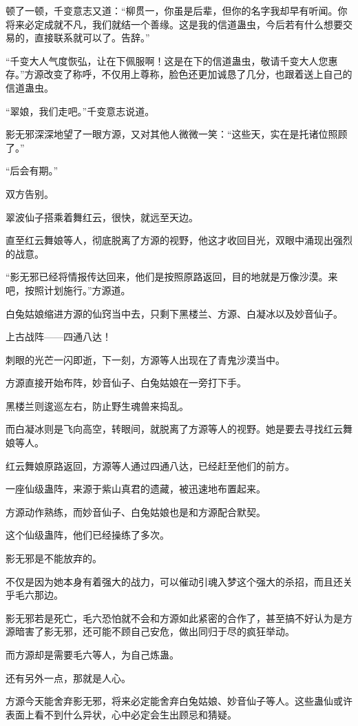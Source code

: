 \begin{this_body}
顿了一顿，千变意志又道：“柳贯一，你虽是后辈，但你的名字我却早有听闻。你将来必定成就不凡，我们就结一个善缘。这是我的信道蛊虫，今后若有什么想要交易的，直接联系就可以了。告辞。”

“千变大人气度恢弘，让在下佩服啊！这是在下的信道蛊虫，敬请千变大人您惠存。”方源改变了称呼，不仅用上尊称，脸色还更加诚恳了几分，也跟着送上自己的信道蛊虫。

“翠娘，我们走吧。”千变意志说道。

影无邪深深地望了一眼方源，又对其他人微微一笑：“这些天，实在是托诸位照顾了。”

“后会有期。”

双方告别。

翠波仙子搭乘着舞红云，很快，就远至天边。

直至红云舞娘等人，彻底脱离了方源的视野，他这才收回目光，双眼中涌现出强烈的战意。

“影无邪已经将情报传达回来，他们是按照原路返回，目的地就是万像沙漠。来吧，按照计划施行。”方源道。

白兔姑娘缩进方源的仙窍当中去，只剩下黑楼兰、方源、白凝冰以及妙音仙子。

上古战阵——四通八达！

刺眼的光芒一闪即逝，下一刻，方源等人出现在了青鬼沙漠当中。

方源直接开始布阵，妙音仙子、白兔姑娘在一旁打下手。

黑楼兰则逡巡左右，防止野生魂兽来捣乱。

而白凝冰则是飞向高空，转眼间，就脱离了方源等人的视野。她是要去寻找红云舞娘等人。

红云舞娘原路返回，方源等人通过四通八达，已经赶至他们的前方。

一座仙级蛊阵，来源于紫山真君的遗藏，被迅速地布置起来。

方源动作熟练，而妙音仙子、白兔姑娘也是和方源配合默契。

这个仙级蛊阵，他们已经操练了多次。

影无邪是不能放弃的。

不仅是因为她本身有着强大的战力，可以催动引魂入梦这个强大的杀招，而且还关乎毛六那边。

影无邪若是死亡，毛六恐怕就不会和方源如此紧密的合作了，甚至搞不好认为是方源暗害了影无邪，还可能不顾自己安危，做出同归于尽的疯狂举动。

而方源却是需要毛六等人，为自己炼蛊。

还有另外一点，那就是人心。

方源今天能舍弃影无邪，将来必定能舍弃白兔姑娘、妙音仙子等人。这些蛊仙或许表面上看不到什么异状，心中必定会生出顾忌和猜疑。


\end{this_body}
